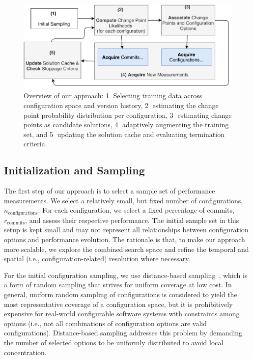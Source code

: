 \documentclass[sigconf]{acmart}
\begin{document}
	\begin{figure}[ht]
		\includegraphics[width=\linewidth]{images/ablauf.pdf}
		\caption{Overview of our approach:  \textcircled{1} Selecting training data across configuration space and version history, \textcircled{2} estimating the change point probability distribution per configuration, \textcircled{3} estimating change points as candidate solutions, \textcircled{4} adaptively augmenting the training set, and \textcircled{5} updating the solution cache and evaluating termination criteria.}
		\label{fig:overview}
	\end{figure}
	
	\subsection{Initialization and Sampling}\label{sec:initialization}
	The first step of our approach is to select a sample set of performance measurements. 
	We select a relatively small, but fixed number of configurations, $n_\text{configurations}$. For each configuration, we select a fixed percentage of commits, $r_\text{commits}$, and assess their respective performance.
	The initial sample set in this setup is kept small and may not represent all relationships between configuration options and performance evolution. 
	The rationale is that, to make our approach more scalable, we explore the combined search space and refine the temporal and  spatial (i.e., configuration-related) resolution where necessary. 
	
	For the initial configuration sampling, we use distance-based  sampling~\cite{kaltenecker_distance-based_2019}, which is a form of random sampling that strives for uniform coverage at low cost. 
	In general, uniform random sampling of configurations is considered to yield the most representative coverage of a configuration space, but it is prohibitively expensive for real-world configurable software systems with constraints among options (i.e., not all combinations of configuration options are valid configurations). 
	Distance-based sampling addresses this problem by demanding the number of selected options to be uniformly distributed to avoid local concentration. 
	
\end{document}
